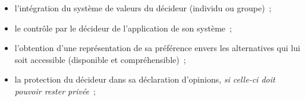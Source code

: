  \begin{itemize}[noitemsep,topsep=0pt,parsep=0pt,partopsep=0pt]
  \item l'intégration du système de valeurs du décideur (individu ou groupe)~;
  \item le contrôle par le décideur de l'application de son système~;
  \item l'obtention d'une représentation de sa préférence envers les alternatives qui lui soit accessible (disponible et compréhensible)~;
  \item la protection du décideur dans sa déclaration d'opinions, \emph{si celle-ci doit pouvoir rester privée}~;
 \end{itemize}
% 
% 
 
